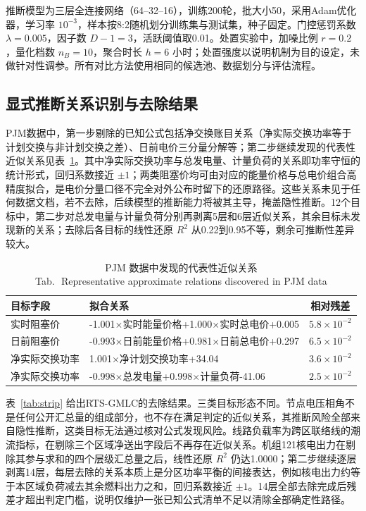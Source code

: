 \documentclass[UTF8,zihao=5,twoside,fontset=none]{ctexart}
\newcommand{\tabbicaption}[2]{\caption{#1\\[-0.2em]\small Tab.\,\thetable\ #2}}
\begin{document}
推断模型为三层全连接网络（64--32--16），训练200轮，批大小50，采用Adam优化器\cite{ref-kingma-adam}，学习率 $10^{-3}$，样本按8:2随机划分训练集与测试集，种子固定。门控惩罚系数 $\lambda=0.005$，因子数 $D-1=3$，活跃阈值取0.01。处置实验中，加噪比例 $r=0.2$，量化档数 $n_B=10$，聚合时长 $h=6$ 小时；处置强度以说明机制为目的设定，未做针对性调参。所有对比方法使用相同的候选池、数据划分与评估流程。

\subsection{显式推断关系识别与去除结果}

PJM数据中，第一步剔除的已知公式包括净交换账目关系（净实际交换功率等于计划交换与非计划交换之差）、日前电价三分量分解等；第二步继续发现的代表性近似关系见表~\ref{tab:formula}。其中净实际交换功率与总发电量、计量负荷的关系即功率守恒的统计形式，回归系数接近 $\pm 1$；两类阻塞价均可由对应的能量价格与总电价组合高精度拟合，是电价分量口径不完全对外公布时留下的还原路径。这些关系未见于任何数据文档，若不去除，后续模型的推断能力将被其主导，掩盖隐性推断。12个目标中，第二步对总发电量与计量负荷分别再剥离5层和6层近似关系，其余目标未发现新的关系；去除后各目标的线性还原 $R^2$ 从0.22到0.95不等，剩余可推断性差异较大。

\begin{table}[!tbp]
\centering
\tabbicaption{PJM 数据中发现的代表性近似关系}{Representative approximate relations discovered in PJM data}
\label{tab:formula}
\setlength{\tabcolsep}{2.6pt}
\begin{tabular}{p{1.72cm}p{3.62cm}c}
\toprule
目标字段 & 拟合关系 & 相对残差 \\
\midrule
实时阻塞价 & -1.001$\times$实时能量价格+1.000$\times$实时总电价+0.005 & $5.8\times10^{-2}$ \\
日前阻塞价 & -0.993$\times$日前能量价格+0.981$\times$日前总电价+0.297 & $6.5\times10^{-2}$ \\
净实际交换功率 & 1.001$\times$净计划交换功率+34.04 & $3.6\times10^{-2}$ \\
净实际交换功率 & -0.998$\times$总发电量+0.998$\times$计量负荷-41.06 & $2.5\times10^{-2}$ \\
\bottomrule
\end{tabular}
\end{table}

表~\ref{tab:strip} 给出RTS-GMLC的去除结果。三类目标形态不同。节点电压相角不是任何公开汇总量的组成部分，也不存在满足判定的近似关系，其推断风险全部来自隐性推断，这类目标无法通过核对公式发现风险。线路负载率为跨区联络线的潮流指标，在剔除三个区域净送出字段后不再存在近似关系。机组121核电出力在剔除其参与求和的四个层级汇总量之后，线性还原 $R^2$ 仍达1.0000；第二步继续逐层剥离14层，每层去除的关系本质上是分区功率平衡的间接表达，例如核电出力约等于本区域负荷减去其余燃料出力之和，回归系数接近 $\pm 1$。14层全部去除完成后残差才超出判定门槛，说明仅维护一张已知公式清单不足以清除全部确定性路径。
\end{document}
